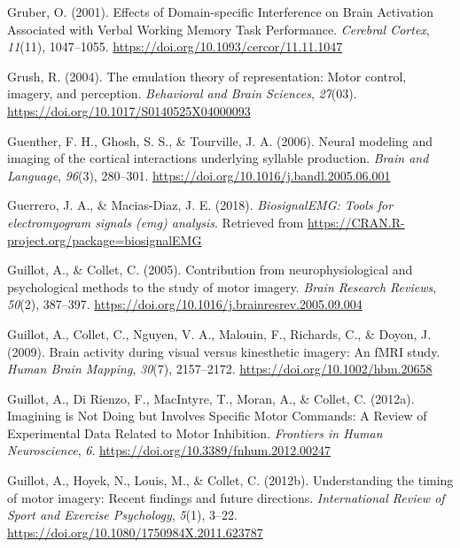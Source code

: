 \documentclass[a4paper,12pt,twoside,openright,oldfontcommands,final]{memoir}
\begin{document}
\leavevmode\hypertarget{ref-gruber_effects_2001}{}%
Gruber, O. (2001). Effects of Domain-specific Interference on Brain Activation Associated with Verbal Working Memory Task Performance. \emph{Cerebral Cortex}, \emph{11}(11), 1047--1055. \url{https://doi.org/10.1093/cercor/11.11.1047}

\leavevmode\hypertarget{ref-grush_emulation_2004}{}%
Grush, R. (2004). The emulation theory of representation: Motor control, imagery, and perception. \emph{Behavioral and Brain Sciences}, \emph{27}(03). \url{https://doi.org/10.1017/S0140525X04000093}

\leavevmode\hypertarget{ref-guenther_neural_2006}{}%
Guenther, F. H., Ghosh, S. S., \& Tourville, J. A. (2006). Neural modeling and imaging of the cortical interactions underlying syllable production. \emph{Brain and Language}, \emph{96}(3), 280--301. \url{https://doi.org/10.1016/j.bandl.2005.06.001}

\leavevmode\hypertarget{ref-R-biosignalEMG}{}%
Guerrero, J. A., \& Macias-Diaz, J. E. (2018). \emph{BiosignalEMG: Tools for electromyogram signals (emg) analysis}. Retrieved from \url{https://CRAN.R-project.org/package=biosignalEMG}

\leavevmode\hypertarget{ref-guillot_contribution_2005}{}%
Guillot, A., \& Collet, C. (2005). Contribution from neurophysiological and psychological methods to the study of motor imagery. \emph{Brain Research Reviews}, \emph{50}(2), 387--397. \url{https://doi.org/10.1016/j.brainresrev.2005.09.004}

\leavevmode\hypertarget{ref-guillot_brain_2009}{}%
Guillot, A., Collet, C., Nguyen, V. A., Malouin, F., Richards, C., \& Doyon, J. (2009). Brain activity during visual versus kinesthetic imagery: An fMRI study. \emph{Human Brain Mapping}, \emph{30}(7), 2157--2172. \url{https://doi.org/10.1002/hbm.20658}

\leavevmode\hypertarget{ref-guillot_imagining_2012}{}%
Guillot, A., Di Rienzo, F., MacIntyre, T., Moran, A., \& Collet, C. (2012a). Imagining is Not Doing but Involves Specific Motor Commands: A Review of Experimental Data Related to Motor Inhibition. \emph{Frontiers in Human Neuroscience}, \emph{6}. \url{https://doi.org/10.3389/fnhum.2012.00247}

\leavevmode\hypertarget{ref-guillot_understanding_2012}{}%
Guillot, A., Hoyek, N., Louis, M., \& Collet, C. (2012b). Understanding the timing of motor imagery: Recent findings and future directions. \emph{International Review of Sport and Exercise Psychology}, \emph{5}(1), 3--22. \url{https://doi.org/10.1080/1750984X.2011.623787}
\end{document}
